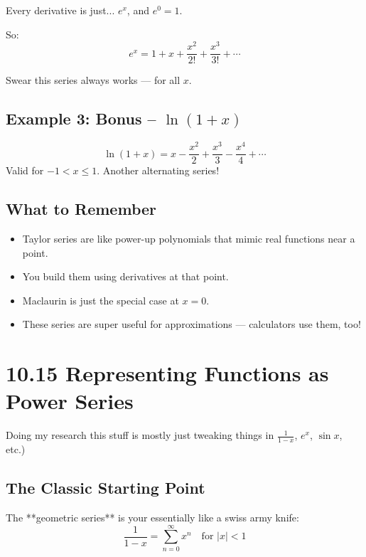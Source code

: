 \documentclass{article}
\begin{document}
Every derivative is just... \( e^x \), and \( e^0 = 1 \).

So:
\[
e^x = 1 + x + \frac{x^2}{2!} + \frac{x^3}{3!} + \cdots
\]

Swear this series always works — for all \( x \).

\subsection*{Example 3: Bonus – \( \ln(1 + x) \)}

\[
\ln(1+x) = x - \frac{x^2}{2} + \frac{x^3}{3} - \frac{x^4}{4} + \cdots
\]
Valid for \( -1 < x \le 1 \). Another alternating series!

\subsection*{What to Remember}
\begin{itemize}
  \item Taylor series are like power-up polynomials that mimic real functions near a point.
  \item You build them using derivatives at that point.
  \item Maclaurin is just the special case at \( x = 0 \).
  \item These series are super useful for approximations — calculators use them, too!
\end{itemize}

\newpage
\section{10.15 Representing Functions as Power Series}

\begin{tcolorbox}[colback=gray!8,colframe=black,title=Big Idea – Turn a Function into an Infinite Polynomial!]
Doing my research this stuff is mostly just tweaking things in \( \frac{1}{1 - x} \), \( e^x \), \( \sin x \), etc.)
\end{tcolorbox}

\subsection*{The Classic Starting Point}
The **geometric series** is your essentially like a swiss army knife:
\[
\frac{1}{1 - x} = \sum_{n=0}^{\infty} x^n \quad \text{for } |x| < 1
\]
\end{document}
